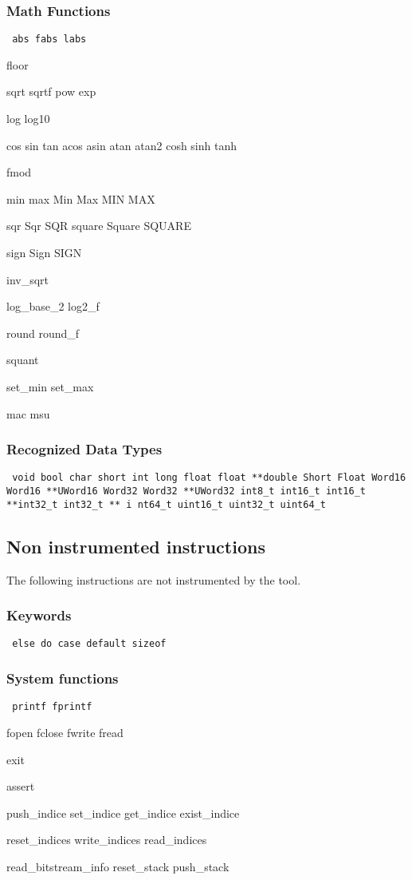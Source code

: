\subsubsection{Math Functions}
{\tt
    abs fabs labs

    floor

    sqrt sqrtf pow exp

    log log10

    cos sin tan acos asin atan atan2 cosh sinh tanh

    fmod

    min max Min Max MIN MAX

    sqr Sqr SQR square Square SQUARE

    sign Sign SIGN

    inv\_sqrt

    log\_base\_2 log2\_f

    round round\_f

    squant

    set\_min set\_max

    mac msu
}

\subsubsection{Recognized Data Types}
{\tt
    void bool char short int long float float **double Short Float Word16 Word16 **UWord16 Word32 Word32 **UWord32
    int8\_t int16\_t int16\_t **int32\_t int32\_t ** i nt64\_t uint16\_t uint32\_t uint64\_t
}

\subsection{Non instrumented instructions}

The following instructions are not instrumented by the tool.

\subsubsection{Keywords}
{\tt
    else
    do
    case
    default
    sizeof
}

\subsubsection{System functions}
{\tt
printf fprintf

fopen fclose fwrite fread

exit

assert

push\_indice set\_indice get\_indice exist\_indice

reset\_indices write\_indices read\_indices

read\_bitstream\_info reset\_stack push\_stack
}

